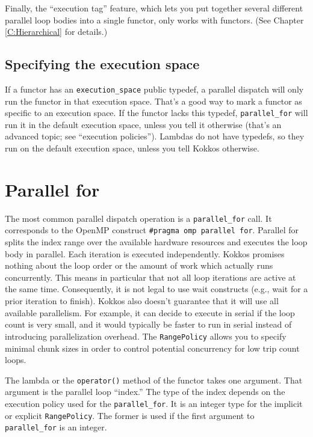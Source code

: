 Finally, the ``execution tag'' feature, which lets you put together several different parallel loop bodies into a single functor,
only works with functors.  (See Chapter \ref{C:Hierarchical} for details.)

\subsection{Specifying the execution space}

If a functor has an \lstinline|execution_space| public typedef, a parallel dispatch will only run the functor in that execution space.
That's a good way to mark a functor as specific to an execution space.  
If the functor lacks this typedef, \lstinline|parallel_for| will run it in the default execution space, unless you tell it otherwise (that's an advanced topic; see ``execution policies'').
Lambdas do not have typedefs, so they run on the default execution space, unless you tell Kokkos otherwise.

\section{Parallel for}

The most common parallel dispatch operation is a \lstinline|parallel_for| call.
It corresponds to the OpenMP construct \lstinline!#pragma omp parallel for!.
Parallel for splits the index range over the available hardware resources and executes the loop body in parallel.
Each iteration is executed independently.
Kokkos promises nothing about the loop order or the amount of work which actually runs concurrently. 
This means in particular that not all loop iterations are active at the same time.  Consequently, it is not legal to use wait constructs (e.g., wait for a prior iteration to finish). 
Kokkos also doesn't guarantee that it will use all available parallelism. 
For example, it can decide to execute in serial if the loop count is very small, and it would typically be faster to run in serial instead of introducing parallelization overhead.
The \lstinline|RangePolicy| allows you to specify minimal chunk sizes in order to control potential concurrency for low trip count loops.

The lambda or the \lstinline!operator()! method of the functor takes one argument.  That argument is the parallel loop ``index.''
The type of the index depends on the execution policy used for the \lstinline!parallel_for!.  It is an integer type for the implicit or explicit \lstinline|RangePolicy|.
The former is used if the first argument to \lstinline|parallel_for| is an integer. 

